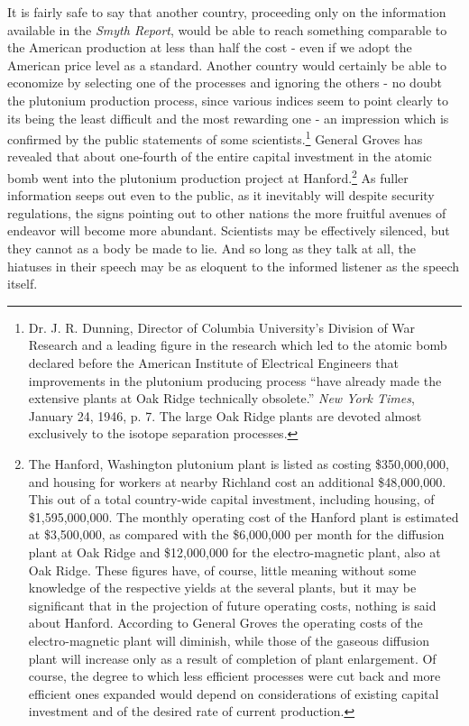 It is fairly safe to say that another country, proceeding only on the information available in the \emph{Smyth Report}, would be able to reach something comparable to the American production at less than half the cost - even if we adopt the American price level as a standard. Another country would certainly be able to economize by selecting one of the processes and ignoring the others - no doubt the plutonium production process, since various indices seem to point clearly to its being the least difficult and the most rewarding one - an impression which is confirmed by the public statements of some scientists.\footnote{Dr. J. R. Dunning, Director of Columbia University's Division of War Research and a leading figure in the research which led to the atomic bomb declared before the American Institute of Electrical Engineers that improvements in the plutonium producing process ``have already made the extensive plants at Oak Ridge technically obsolete.'' \textit{New York Times}, January 24, 1946, p. 7. The large Oak Ridge plants are devoted almost exclusively to the isotope separation processes.} General Groves has revealed that about one-fourth of the entire capital investment in the atomic bomb went into the plutonium production project at Hanford.\footnote{The Hanford, Washington plutonium plant is listed as costing \$350,000,000, and housing for workers at nearby Richland cost an additional \$48,000,000. This out of a total country-wide capital investment, including housing, of \$1,595,000,000. The monthly operating cost of the Hanford plant is estimated at \$3,500,000, as compared with the \$6,000,000 per month for the diffusion plant at Oak Ridge and \$12,000,000 for the electro-magnetic plant, also at Oak Ridge. These figures have, of course, little meaning without some knowledge of the respective yields at the several plants, but it may be significant that in the projection of future operating costs, nothing is said about Hanford. According to General Groves the operating costs of the electro-magnetic plant will diminish, while those of the gaseous diffusion plant will increase only as a result of completion of plant enlargement. Of course, the degree to which less efficient processes were cut back and more efficient ones expanded would depend on considerations of existing capital investment and of the desired rate of current production.} As fuller information seeps out even to the public, as it inevitably will despite security regulations, the signs pointing out to other nations the more fruitful avenues of endeavor will become more abundant. Scientists may be effectively silenced, but they cannot as a body be made to lie. And so long as they talk at all, the hiatuses in their speech may be as eloquent to the informed listener as the speech itself.
